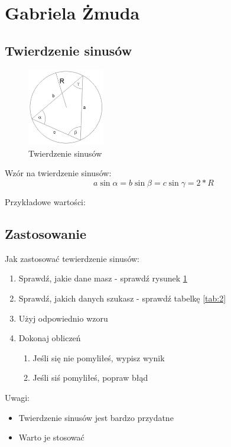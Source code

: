 \section{Gabriela Żmuda}

\subsection{Twierdzenie sinusów}

\begin{figure}[htbp]
    \centering
    \includegraphics[width=0.3\textwidth]{pictures/sinus.jpg} 
    \caption{\label{fig:frog}Twierdzenie sinusów}
\end{figure}

Wzór na twierdzenie sinusów: \[a \sin \alpha = b \sin \beta = c \sin \gamma = 2 * R\]

Przykładowe wartości:



\subsection{Zastosowanie}
Jak zastosować tewierdzenie sinusów:
\begin{enumerate}
    \item Sprawdź, jakie dane masz - sprawdź rysunek \ref{fig:frog}
    \item Sprawdź, jakich danych szukasz - sprawdź tabelkę \ref{tab:2}
    \item Użyj odpowiednio wzoru
    \item Dokonaj obliczeń
    \begin{enumerate}
        \item Jeśli się nie pomyliłeś, wypisz wynik
        \item Jeśli siś pomyliłeś, popraw błąd
    \end{enumerate}
\end{enumerate}

Uwagi:
\begin{itemize}
    \item Twierdzenie sinusów jest bardzo przydatne
    \item Warto je stosować
\end{itemize}

